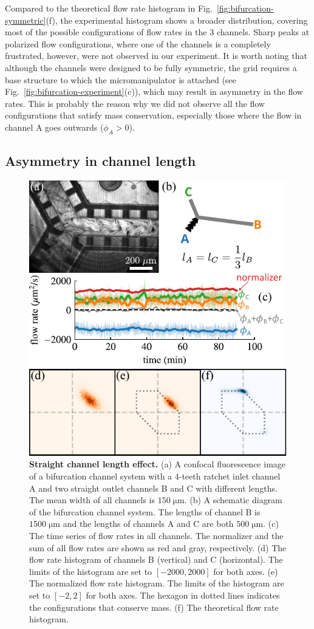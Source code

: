 \documentclass[%
10pt,
superscriptaddress,
twocolumn,
 amsmath,amssymb,
 aps,prx,
]{revtex4-2}
\begin{document}
Compared to the theoretical flow rate histogram in Fig.~\ref{fig:bifurcation-symmetric}(f), the experimental histogram shows a broader distribution, covering most of the possible configurations of flow rates in the 3 channels.
Sharp peaks at polarized flow configurations, where one of the channels is a completely frustrated, however, were not observed in our experiment. 
It is worth noting that although the channels were designed to be fully symmetric, the grid requires a base structure to which the micromanipulator is attached (see Fig.~\ref{fig:bifurcation-experiment}(c)), which may result in asymmetry in the flow rates.
This is probably the reason why we did not observe all the flow configurations that satisfy mass conservation, especially those where the flow in channel A goes outwards ($\phi_A> 0$).

\subsection{Asymmetry in channel length}

\begin{figure}[t]
    \includegraphics[width=.45\textwidth]{bifurcation-asymmetric.pdf}
    \caption{
    \textbf{Straight channel length effect.}
    (a) A confocal fluorescence image of a bifurcation channel system with a 4-teeth ratchet inlet channel A and two straight outlet channels B and C with different lengths. The mean width of all channels is $150\;\mathrm{\mu m}$. 
    (b) A schematic diagram of the bifurcation channel system. The lengths of channel B is $1500\;\mathrm{\mu m}$ and the lengths of channels A and C are both $500\;\mathrm{\mu m}$.
    (c) The time series of flow rates in all channels. The normalizer and the sum of all flow rates are shown as red and gray, respectively. 
    (d) The flow rate histogram of channels B (vertical) and C (horizontal). The limits of the histogram are set to $[-2000, 2000]$ for both axes.
    (e) The normalized flow rate histogram. The limits of the histogram are set to $[-2, 2]$ for both axes. The hexagon in dotted lines indicates the configurations that conserve mass.
    (f) The theoretical flow rate histogram. 
    }
    \label{fig:bifurcation-asymmetric}
\end{figure}
\end{document}
